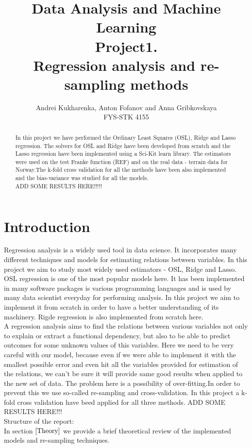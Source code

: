 \documentclass[10pt]{article}
\begin{document}
\setlength\parindent{1pt}
\title{Data Analysis and Machine Learning \\
Project1.\\ Regression analysis and re-sampling methods}
\author{Andrei Kukharenka, Anton Fofanov and Anna Gribkovskaya \\  
FYS-STK 4155 
}

\maketitle
\begin{abstract}
In this project we have performed the Ordinary Least Squares (OSL), Ridge and Lasso regression. The solvers for OSL and Ridge have been developed from scratch and the Lasso regression have been implemented using a Sci-Kit learn library. The estimators were used on the test Franke function (REF) and on the real data - terrain data for Norway.The k-fold cross validation for all the methods have been also implemented and the bias-variance was studied for all the models.\\
ADD SOME RESULTS HERE!!!!!
\end{abstract}
\clearpage 


\section*{Introduction}
Regression analysis is a widely used tool in data science. It incorporates many different techniques and models for estimating relations between variables. In this project we aim to study most widely used estimators - OSL, Ridge and Lasso.
OSL regression is one of the most popular models here. It has been implemented in many software packages is various programming languages and is used by many data scientist everyday for performing analysis. In this project we aim to implement it from scratch in order to have a better understanding of its machinery. Rigde regression is also implemented from scratch here. \\
A regression analysis aims to find the relations between various variables not only to explain or extract a functional dependency, but also to be able to predict outcomes for some unknown values of this variables. Here we need to be very careful with our model, because even if we were able to implement it with the smallest possible error and even hit all the variables provided for estimation of the relations, we can't be sure it will provide same good results when applied to the new set of data. The problem here is a possibility of over-fitting.In order to prevent this we use so-called re-sampling and cross-validation. In this project a k-fold cross validation have beed applied for all three methods. ADD SOME RESULTS HERE!!!\\
Structure of the report:\\
In section $\ref{Theory}$ we provide a brief theoretical review of the implemented models and re-sampling techniques.\\
\end{document}
